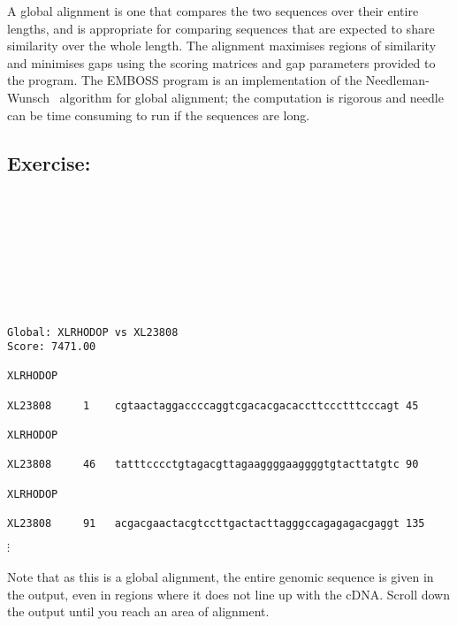 \documentclass[12pt]{report}
\begin{document}
A global alignment is one that compares	the two	sequences over their
entire lengths,	and is appropriate for comparing sequences that	are
expected to share similarity over the whole length. The	alignment
maximises regions of similarity	and minimises gaps using the scoring
matrices and gap parameters provided to	the program. The EMBOSS
program	 is an implementation of the Needleman-Wunsch~\cite{Needle:70} algorithm for global alignment; the computation is	rigorous and needle
can be time consuming to run if	the sequences are long.

\subsection*{Exercise: }

\unix{}\\
\\
\\
\\
\\
\\
\\

\unix{}
\begin{verbatim}
Global:	XLRHODOP vs XL23808
Score: 7471.00

XLRHODOP

XL23808		1	 cgtaactaggaccccaggtcgacacgacaccttccctttcccagt 45

XLRHODOP

XL23808		46	 tatttcccctgtagacgttagaaggggaaggggtgtacttatgtc 90

XLRHODOP

XL23808		91	 acgacgaactacgtccttgactacttagggccagagagacgaggt 135
\end{verbatim}
$\vdots$
\\
\\
\noindent Note that as this is a global	alignment, the entire genomic sequence
is given in the	output,	even in	regions	where it does not line up with
the cDNA. Scroll down the output until you reach an area of alignment.
\end{document}
